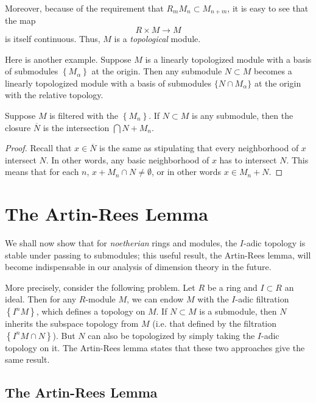 Moreover, because of the requirement that $R_m M_{n}  \subset M_{n+m}$, it is
easy to see that the map
\[ R \times M \to M  \]
is itself continuous. Thus, $M$ is a \emph{topological} module.

Here is another example. Suppose $M$ is a linearly topologized module with a
basis of submodules $\left\{M_\alpha\right\}$ at the origin. Then any
submodule $N \subset M$ becomes a linearly topologized module with a basis of
submodules $\{N \cap M_\alpha\}$ at the origin with the relative topology.


\begin{proposition} 
Suppose $M$ is filtered with the $\left\{M_n\right\}$. If $N \subset M$ is any
submodule, then the closure $\overline{N}$ is the intersection $\bigcap N + M_n$.
\end{proposition} 
\begin{proof} 
Recall that $x \in \overline{N}$ is the same as stipulating that every
neighborhood of $x$ intersect $N$. In other words, any basic neighborhood of
$x$ has to intersect $N$. This means that for each $n$, $x+M_n \cap N \neq
\emptyset$, or in other words $x \in M_n + N$.
\end{proof} 

\section{The Artin-Rees Lemma}

We shall now show that for \emph{noetherian} rings and modules, the $I$-adic
topology is stable under passing to submodules; this useful result, the
Artin-Rees lemma, will become indispensable in our analysis of dimension
theory in the future.

More precisely, consider the following problem. Let $R$ be a ring and $I
\subset R$ an ideal. Then for any $R$-module $M$, we can endow $M$ with the
$I$-adic filtration $\left\{I^n M\right\}$, which defines a topology on $M$.
If $N \subset M$ is a submodule, then 
$N$ inherits the subspace topology from $M$ (i.e. that defined by the filtration
$\left\{I^n M \cap N\right\}$). But $N$ can also be topologized by simply
taking the $I$-adic topology on it. The Artin-Rees lemma states that these two
approaches give the same result.

\subsection{The Artin-Rees Lemma}

